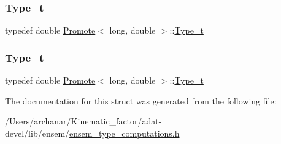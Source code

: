 \subsubsection{\texorpdfstring{Type\_t}{Type\_t}\hspace{0.1cm}{\footnotesize\ttfamily [2/3]}}
{\footnotesize\ttfamily typedef double \mbox{\hyperlink{structPromote}{Promote}}$<$ long, double $>$\+::\mbox{\hyperlink{structPromote_3_01long_00_01double_01_4_aab2bb863f5db06bd92f7818e53d06867}{Type\+\_\+t}}}

\mbox{\label{structPromote_3_01long_00_01double_01_4_aab2bb863f5db06bd92f7818e53d06867}} 
\subsubsection{\texorpdfstring{Type\_t}{Type\_t}\hspace{0.1cm}{\footnotesize\ttfamily [3/3]}}
{\footnotesize\ttfamily typedef double \mbox{\hyperlink{structPromote}{Promote}}$<$ long, double $>$\+::\mbox{\hyperlink{structPromote_3_01long_00_01double_01_4_aab2bb863f5db06bd92f7818e53d06867}{Type\+\_\+t}}}



The documentation for this struct was generated from the following file\+:\begin{DoxyCompactItemize}
\item 
/\+Users/archanar/\+Kinematic\+\_\+factor/adat-\/devel/lib/ensem/\mbox{\hyperlink{adat-devel_2lib_2ensem_2ensem__type__computations_8h}{ensem\+\_\+type\+\_\+computations.\+h}}\end{DoxyCompactItemize}
